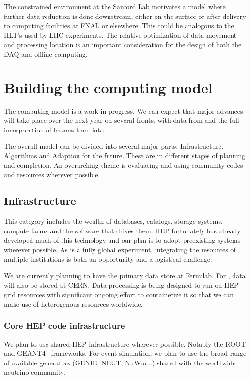 \begin{enumerate}
The constrained environment at the Sanford Lab motivates a model where further data reduction is done downstream, either on the surface or after delivery to computing facilities at FNAL or elsewhere. This could be analogous to the HLT's used by LHC experiments. The relative optimization of data movement and processing location is an important consideration for the design of both the DAQ and offline computing.




\section{Building the computing model}\label{sw:bld-cmp-mdl}

The   computing model is a work in progress.  We can expect that major advances will take place over the next year on several fronts, with data from  and the full incorporation of lessons from   into  . 


The overall model can be divided into several major parts:  Infrastructure, Algorithms and Adaption for the future.  These are in different stages of planning and completion.  An overarching theme is evaluating and using community codes and resources wherever possible. 



\subsection{Infrastructure}
This category includes the wealth of databases, catalogs, storage systems, compute farms and the software that drives them.  HEP fortunately has already developed much of this technology and our plan is to adopt preexisting systems wherever possible.  As   is a fully global experiment, integrating the resources of multiple institutions is both an opportunity and a logistical challenge.

We are currently planning to have the primary data store at Fermilab.  For , data will also be stored at CERN.  Data processing is being designed to run on HEP grid resources with significant ongoing effort to containerize it so that we can make use of heterogenous resources worldwide. 


\subsubsection{Core HEP code infrastructure}
We plan to use shared HEP infrastructure wherever possible.  Notably the ROOT\cite{root} and GEANT4~\cite{geant4,Allison:2006ve} frameworks.   For event simulation, we plan to use the broad range of available generators (GENIE, NEUT, NuWro...) shared with the worldwide neutrino community.


\end{enumerate}
